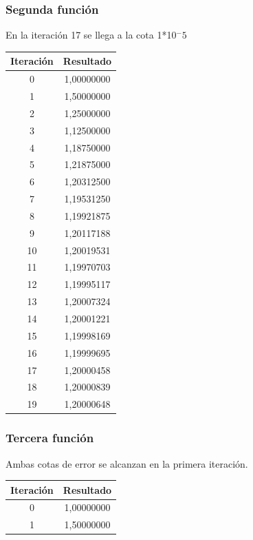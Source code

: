 \documentclass[titlepage,a4paper]{article}
\begin{document}
\subsubsection{Segunda función}\label{sec:bis2}

En la iteración 17 se llega a la cota 1*10$^-5$

\begin{center}
    \begin{tabular}{| c | c |}
    \hline
     Iteración & Resultado \\ \hline
        0     & 1,00000000 \\
        1     & 1,50000000 \\
        2     & 1,25000000 \\
        3     & 1,12500000 \\
        4     & 1,18750000 \\
        5     & 1,21875000 \\
        6     & 1,20312500 \\
        7     & 1,19531250 \\
        8     & 1,19921875 \\
        9     & 1,20117188 \\
        10    & 1,20019531 \\
        11    & 1,19970703 \\
        12    & 1,19995117 \\
        13    & 1,20007324 \\
        14    & 1,20001221 \\
        15    & 1,19998169 \\
        16    & 1,19999695 \\
        17    & 1,20000458 \\
        18    & 1,20000839 \\
        19    & 1,20000648 \\
    \hline
    \end{tabular}
\end{center}

\subsubsection{Tercera función}\label{sec:bis3}

Ambas cotas de error se alcanzan en la primera iteración.

\begin{center}
    \begin{tabular}{| c | c |}
    \hline
     Iteración & Resultado \\ \hline
        0     & 1,00000000 \\
        1     & 1,50000000 \\
    \hline
    \end{tabular}
\end{center}
\end{document}
